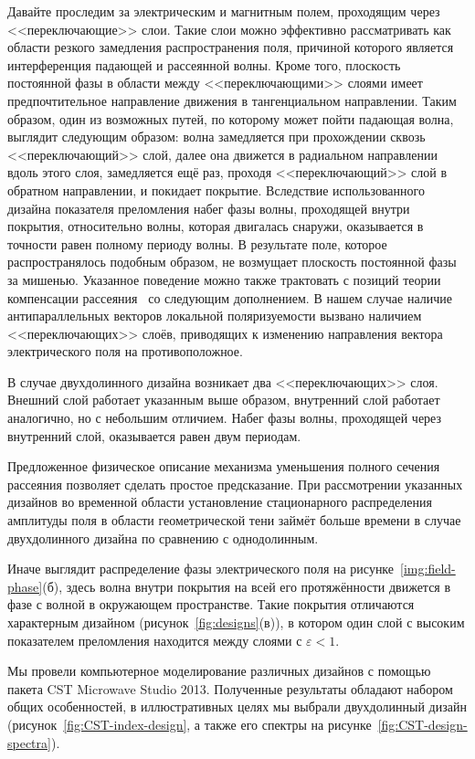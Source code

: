 Давайте проследим за электрическим и магнитным полем, проходящим
через <<переключающие>> слои.  Такие слои можно эффективно
рассматривать как области резкого замедления распространения поля,
причиной которого является интерференция падающей и рассеянной волны.
Кроме того, плоскость постоянной фазы в области между
<<переключающими>> слоями имеет предпочтительное направление движения
в тангенциальном направлении.  Таким образом, один из возможных путей,
по которому может пойти падающая волна, выглядит следующим образом:
волна замедляется при прохождении сквозь <<переключающий>> слой, далее
она движется в радиальном направлении вдоль этого слоя,
замедляется ещё раз, проходя <<переключающий>> слой в обратном
направлении, и покидает покрытие.  Вследствие использованного дизайна
показателя преломления  набег фазы волны, проходящей внутри покрытия,
относительно волны, которая двигалась снаружи, оказывается в точности
равен полному периоду волны.  В результате поле, которое
распространялось подобным образом, не возмущает плоскость постоянной
фазы за мишенью.  Указанное поведение можно также трактовать с позиций
теории компенсации рассеяния~\cite{alu} со следующим дополнением.  В
нашем случае наличие антипараллельных векторов локальной
поляризуемости  вызвано наличием <<переключающих>> слоёв, приводящих к
изменению направления вектора электрического поля на противоположное.

В случае двухдолинного дизайна возникает два <<переключающих>> слоя.
Внешний слой работает указанным выше образом, внутренний слой работает
аналогично, но с небольшим отличием.  Набег фазы волны, проходящей
через внутренний слой, оказывается равен двум периодам.

Предложенное физическое описание механизма уменьшения полного сечения
рассеяния позволяет сделать простое предсказание.  При рассмотрении
указанных дизайнов во временной области установление стационарного
распределения амплитуды поля в области геометрической тени займёт
больше времени в случае двухдолинного дизайна по сравнению с
однодолинным.  

Иначе выглядит распределение фазы электрического поля на
рисунке~\ref{img:field-phase}(б), здесь волна внутри покрытия на всей
его протяжённости движется в фазе с волной в окружающем пространстве.
Такие покрытия отличаются характерным дизайном
(рисунок~\ref{fig:designs}(в)), в котором один слой с высоким
показателем преломления находится между слоями с ${\varepsilon<1}$.

Мы провели компьютерное моделирование различных дизайнов с помощью
пакета CST Microwave Studio 2013.  Полученные результаты обладают
набором общих особенностей, в иллюстративных целях мы выбрали
двухдолинный дизайн (рисунок~\ref{fig:CST-index-design}, а также его
спектры на рисунке~\ref{fig:CST-design-spectra}).

